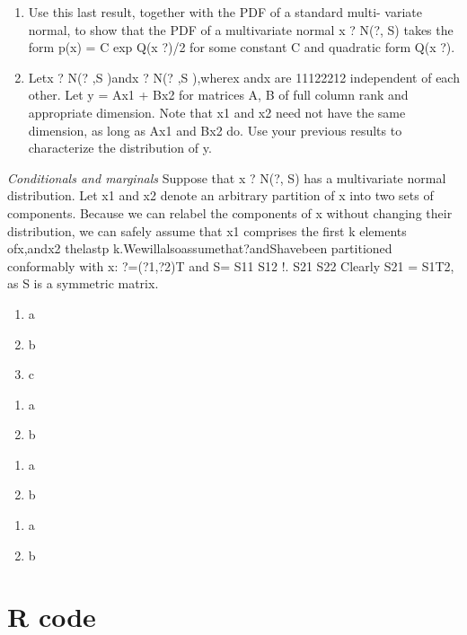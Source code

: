 \documentclass{homework}
\begin{document}
\begin{enumerate}[label=(\Alph*)]
\item Use this last result, together with the PDF of a standard multi- variate normal, to show that the PDF of a multivariate normal
x ? N(?, S) takes the form p(x) = C exp{ Q(x   ?)/2} for some constant C and quadratic form Q(x   ?).

\item Letx ? N(? ,S )andx ? N(? ,S ),wherex andx are 11122212
independent of each other. Let y = Ax1 + Bx2 for matrices A, B of full column rank and appropriate dimension. Note that x1 and x2 need not have the same dimension, as long as Ax1 and Bx2 do. Use your previous results to characterize the distribution of y.

\end{enumerate}

\textit{Conditionals and marginals}
Suppose that x ? N(?, S) has a multivariate normal distribution. Let x1 and x2 denote an arbitrary partition of x into two sets of components. Because we can relabel the components of x without changing their distribution, we can safely assume that x1 comprises the first k elements ofx,andx2 thelastp k.Wewillalsoassumethat?andShavebeen partitioned conformably with x:
?=(?1,?2)T and S= S11 S12 !. S21 S22
Clearly S21 = S1T2, as S is a symmetric matrix.
\begin{enumerate}[label=(\Alph*)]
\item a
\item b
\item c
\end{enumerate}

\begin{enumerate}[label=(\Alph*)]
\item a
\item b
\end{enumerate}

\begin{enumerate}[label=(\Alph*)]
\item a
\item b
\end{enumerate}

\begin{enumerate}[label=(\Alph*)]
\item a
\item b
\end{enumerate}

\clearpage

\appendix
\chapter{R code}
\label{chap:code}
\end{document}
